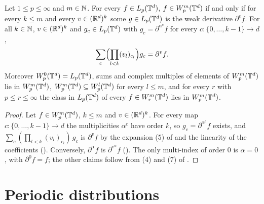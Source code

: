 \begin{theorem}
\label{thm:torus-sobolev-directions}
\leanok
{}
Let $1 \leq p \leq \infty$ and $m \in \mathbb{N}$. For every $f \in L_p(\mathbb{T}^d)$, $f \in W^{m}_{p}(\mathbb{T}^d)$
if and only if for every $k \leq m$ and every $v \in (\mathbb{R}^d)^k$ some $g \in L_p(\mathbb{T}^d)$ is the
weak derivative $\partial^v f$. For all $k \in \mathbb{N}$, $v \in (\mathbb{R}^d)^k$ and
$g_c \in L_p(\mathbb{T}^d)$ with $g_c = \partial^{\alpha^c} f$ for every
$c \colon \{0, \dots, k-1\} \to d$,
\[
  \sum_c \Bigl( \prod_{l < k} (v_l)_{c_l} \Bigr) g_c = \partial^v f .
\]
Moreover $W^{0}_{p}(\mathbb{T}^d) = L_p(\mathbb{T}^d)$, sums and complex
multiples of elements of $W^{m}_{p}(\mathbb{T}^d)$ lie in $W^{m}_{p}(\mathbb{T}^d)$,
$W^{m}_{p}(\mathbb{T}^d) \subseteq W^{l}_{p}(\mathbb{T}^d)$ for every $l \leq m$, and for every $r$ with
$p \leq r \leq \infty$ the class in $L_p(\mathbb{T}^d)$ of every $f \in W^{m}_{r}(\mathbb{T}^d)$ lies in
$W^{m}_{p}(\mathbb{T}^d)$.
\end{theorem}

\begin{proof}
\leanok
Let $f \in W^{m}_{p}(\mathbb{T}^d)$, $k \leq m$ and $v \in (\mathbb{R}^d)^k$. For every map
$c \colon \{0, \dots, k-1\} \to d$ the multiplicities $\alpha^c$ have order $k$, so
$g_c = \partial^{\alpha^c} f$ exists, and $\sum_c (\prod_{l < k} (v_l)_{c_l}) \, g_c$ is
$\partial^v f$ by the expansion (5) of  and the linearity of the
coefficients (). Conversely, $\partial^\alpha f$ is
$\partial^{v^\alpha} f$ (). The only multi-index of
order $0$ is $\alpha = 0$, with $\partial^0 f = f$; the other claims follow from (4) and (7) of
.
\end{proof}

\section{Periodic distributions}
\label{sec:torus-periodic-distributions}

